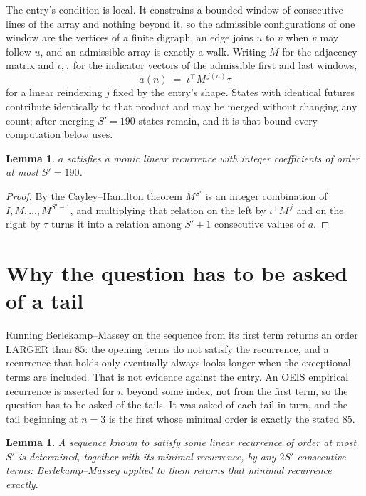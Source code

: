 \documentclass[11pt,a4paper]{article}
\theoremstyle{plain}
\newtheorem{lemma}[theorem]{Lemma}
\theoremstyle{definition}
\begin{document}
The entry's condition is local. It constrains a bounded window of consecutive lines of the
array and nothing beyond it, so the admissible configurations of one window are the vertices of
a finite digraph, an edge joins $u$ to $v$ when $v$ may follow $u$, and an admissible array is
exactly a walk. Writing $M$ for the adjacency matrix and $\iota,\tau$ for the indicator vectors
of the admissible first and last windows,
\[
a(n)\;=\;\iota^{\!\top}M^{\,j(n)}\tau
\]
for a linear reindexing $j$ fixed by the entry's shape. States with identical futures
contribute identically to that product and may be merged without changing any count; after
merging $S'=190$ states remain, and it is that bound every computation below uses.

\begin{lemma}\label{lem:cf}
$a$ satisfies a monic linear recurrence with integer coefficients of order at most $S'=190$.
\end{lemma}

\begin{proof}
By the Cayley--Hamilton theorem $M^{S'}$ is an integer combination of $I,M,\dots,M^{S'-1}$,
and multiplying that relation on the left by $\iota^{\!\top}M^{\,j}$ and on the right by
$\tau$ turns it into a relation among $S'+1$ consecutive values of $a$.
\end{proof}

\section{Why the question has to be asked of a tail}

Running Berlekamp--Massey on the sequence from its first term returns an order LARGER than $85$: the opening terms do not satisfy the recurrence, and a recurrence that holds only eventually always looks longer when the exceptional terms are included. That is not evidence against the entry. An OEIS empirical recurrence is asserted for $n$ beyond some index, not from the first term, so the question has to be asked of the tails. It was asked of each tail in turn, and the tail beginning at $n=3$ is the first whose minimal order is exactly the stated $85$.

\begin{lemma}\label{lem:bm}
A sequence known to satisfy some linear recurrence of order at most $S'$ is determined,
together with its minimal recurrence, by any $2S'$ consecutive terms: Berlekamp--Massey applied
to them returns that minimal recurrence exactly.
\end{lemma}
\end{document}
